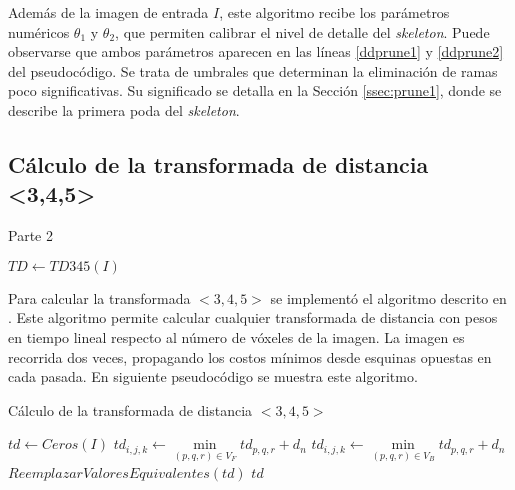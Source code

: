 Además de la imagen de entrada $I$, este algoritmo recibe los parámetros numéricos $\theta_{1}$ y $\theta_{2}$, que permiten calibrar el nivel de detalle del \textit{skeleton}. Puede observarse que ambos parámetros aparecen en las líneas \ref{ddprune1} y \ref{ddprune2} del pseudocódigo. Se trata de umbrales que determinan la eliminación de ramas poco significativas. Su significado se detalla  en la Sección \ref{ssec:prune1}, donde se describe la primera poda del \textit{skeleton}.

\subsection{Cálculo de la transformada de distancia <3,4,5>}

\begin{algorithm}[H]
\caption{Parte 2}
\begin{algorithmic}[1]
\State $TD \gets TD345(I)$
\end{algorithmic}
\end{algorithm}

Para calcular la transformada $<3,4,5>$ se implementó el algoritmo descrito en \cite{borgefors1996digital}. Este algoritmo permite calcular cualquier transformada de distancia con pesos en tiempo lineal respecto al número de vóxeles de la imagen. La imagen es recorrida dos veces, propagando los costos mínimos desde esquinas opuestas en cada pasada. En siguiente pseudocódigo se muestra este algoritmo.

\begin{algorithm}[H]
\caption{Cálculo de la transformada de distancia $<3,4,5>$}
\label{alg:ddskel}
\begin{algorithmic}[1]
	\State $td \gets Ceros(I)$
	 
        	\State $td_{i,j,k} \gets \min\limits_{(p,q,r) \in V_F}{td_{p,q,r} + d_n}$
        \EndIf
    \EndFor
    \EndFor
    \EndFor
	 
        	\State $td_{i,j,k} \gets \min\limits_{(p,q,r) \in V_B}{td_{p,q,r} + d_n}$
        \EndIf
    \EndFor
    \EndFor
    \EndFor
    \State $ReemplazarValoresEquivalentes(td)$
    \State \Return $td$
\EndFunction
\end{algorithmic}
\end{algorithm}

